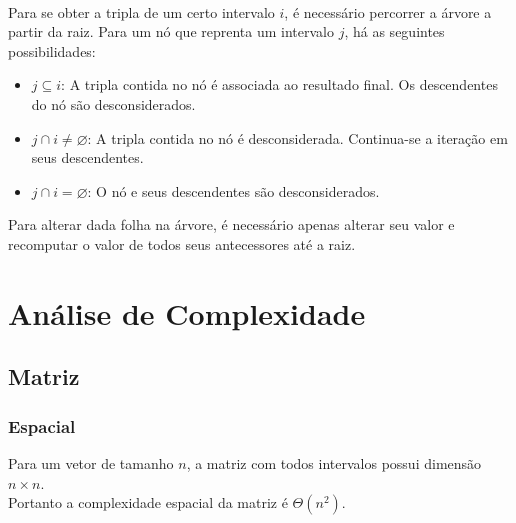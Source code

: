 \documentclass{article}
\begin{document}
\begin{diagram}[h]
\end{diagram}\\
Para se obter a tripla de um certo intervalo $i$, é necessário percorrer a árvore a partir da raiz.
Para um nó que reprenta um intervalo $j$, há as seguintes possibilidades:
\vspace{-8pt}
\begin{itemize}
  \setlength\itemsep{0px}
  \item $j \subseteq i$: A tripla contida no nó é associada ao resultado final. Os descendentes do nó são desconsiderados.
  \item $j \cap i \neq \varnothing$: A tripla contida no nó é desconsiderada. Continua-se a iteração em seus descendentes.
  \item $j \cap i = \varnothing$: O nó e seus descendentes são desconsiderados.
\end{itemize}
Para alterar dada folha na árvore, é necessário apenas alterar seu valor e recomputar o valor de todos seus antecessores até a raiz.


\section{Análise de Complexidade}

\subsection{Matriz}
\subsubsection{Espacial}
Para um vetor de tamanho $n$, a matriz com todos intervalos possui dimensão $n \times n$. \\
Portanto a complexidade espacial da matriz é $\Theta(n^2)$.
\end{document}
